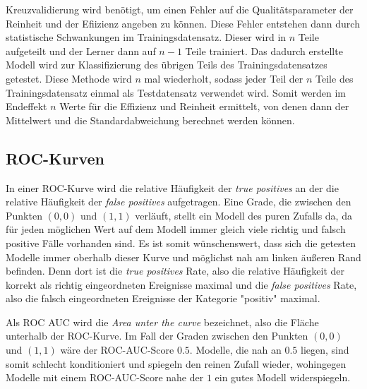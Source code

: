 Kreuzvalidierung wird benötigt, um einen Fehler auf die Qualitätsparameter der Reinheit und der Efiizienz angeben zu 
können. Diese Fehler entstehen dann durch statistische Schwankungen im Trainingsdatensatz. Dieser wird in $n$ Teile 
aufgeteilt und der Lerner dann auf $n-1$ Teile trainiert. Das dadurch erstellte Modell wird zur Klassifizierung des
übrigen Teils des Trainingsdatensatzes getestet. Diese Methode wird $n$ mal wiederholt, sodass jeder Teil der $n$ 
Teile des Trainingsdatensatz einmal als Testdatensatz verwendet wird. Somit werden im Endeffekt $n$ Werte für die 
Effizienz und Reinheit ermittelt, von denen dann der Mittelwert und die Standardabweichung berechnet werden können.

\subsection{ROC-Kurven}

In einer ROC-Kurve wird die relative Häufigkeit der \textit{true positives} an der 
die relative Häufigkeit der 
\textit{false positives} aufgetragen. Eine Grade, die zwischen den Punkten 
$\left(0,0 \right)$ und $\left(1,1 \right)$ verläuft, stellt ein Modell 
des puren Zufalls da, da für jeden möglichen Wert auf dem Modell immer gleich viele 
richtig und falsch positive Fälle vorhanden sind. Es ist somit wünschenswert, dass 
sich die getesten Modelle immer oberhalb dieser Kurve und möglichst nah am linken 
äußeren Rand befinden. Denn dort ist die \textit{true positives} Rate, also 
die relative Häufigkeit der korrekt als richtig eingeordneten Ereignisse maximal 
und die \textit{false positives} Rate, also die falsch eingeordneten Ereignisse 
der Kategorie "positiv" maximal. \par
Als ROC AUC wird die \textit{Area unter the curve} bezeichnet, also die Fläche 
unterhalb der ROC-Kurve. Im Fall der Graden zwischen den Punkten $\left(0,0 \right)$ und $\left(1,1 \right)$
wäre der ROC-AUC-Score $0.5$. Modelle, die nah an $0.5$ liegen, sind somit 
schlecht konditioniert und spiegeln den reinen Zufall wieder, wohingegen 
Modelle mit einem ROC-AUC-Score nahe der $1$ ein gutes Modell widerspiegeln.
